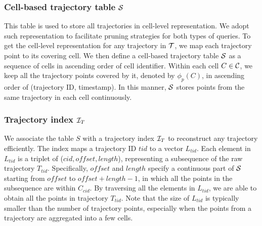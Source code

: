 \documentclass[10pt,conference,letterpaper]{IEEEtran}
\newcommand{\alltraj}{{{\cal T}}\xspace}
\newcommand{\allcell}{{\cal C}\xspace}
\newcommand{\trajtable}{{\cal S}\xspace}
\newcommand{\trajindex}{{{\cal I}_T}\xspace}
\begin{document}
\subsubsection{Cell-based trajectory table $\trajtable$}
This table is used to store all trajectories in cell-level representation. We adopt such representation to facilitate pruning strategies for both types of queries.
To get the cell-level representation for any trajectory in $\alltraj$, we map each trajectory point to its covering cell.
We then define a cell-based trajectory table $\trajtable$ as a sequence of cells in ascending order of cell identifier.
Within each cell $C\in\allcell$, we keep all the trajectory points covered by it, denoted by $\phi_p(C)$, in ascending order of (trajectory ID, timestamp).
In this manner, $\trajtable$ stores points from the same trajectory in each cell continuously.



\subsubsection{Trajectory index $\trajindex$}
We associate the table $S$ with a trajectory index $\trajindex$ to reconstruct any trajectory efficiently. The index maps a trajectory ID $tid$ to a vector $L_{tid}$. Each element in $L_{tid}$ is a triplet of ($cid, offset, length$), representing a subsequence of the raw trajectory $T_{tid}$. Specifically, $offset$ and $length$ specify a continuous part of $\trajtable$ starting from $offset$ to $offset+length-1$, in which all the points in the subsequence are within $C_{cid}$. By traversing all the elements in $L_{tid}$, we are able to obtain all the points in trajectory $T_{tid}$. Note that the size of $L_{tid}$ is typically smaller than the number of trajectory points, especially when the points from a trajectory are aggregated into a few cells.
\end{document}
